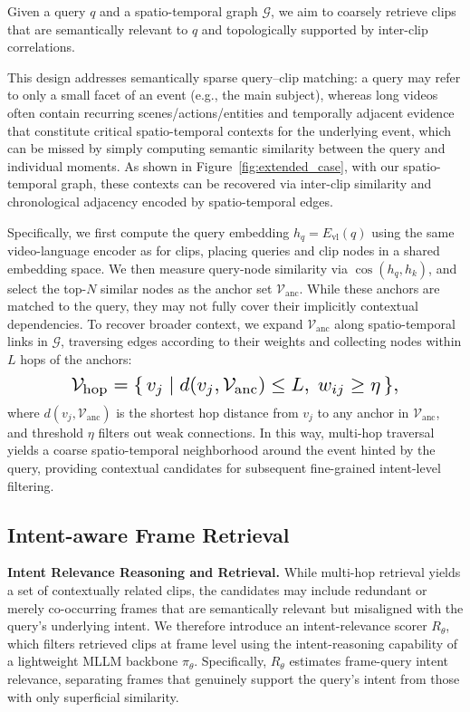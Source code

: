 Given a query $q$ and a spatio-temporal graph $\mathcal{G}$, we aim to coarsely retrieve clips that are semantically relevant to $q$ and topologically supported by inter-clip correlations. {This design addresses semantically sparse query–clip matching: a query may refer to only a small facet of an event (e.g., the main subject), whereas long videos often contain recurring scenes/actions/entities and temporally adjacent evidence that constitute critical spatio-temporal contexts for the underlying event, which can be missed by simply computing semantic similarity between the query and individual moments. As shown in Figure~\ref{fig:extended_case}, with our spatio-temporal graph, these contexts can be recovered via inter-clip similarity and chronological adjacency encoded by spatio-temporal edges. 

Specifically, we first compute the query embedding $h_q = E_{\text{vl}}(q)$ using the same video-language encoder as for clips, placing queries and clip nodes in a shared embedding space. We then measure query-node similarity via $\cos(h_q, h_k)$, and select the top-$N$ similar nodes as the anchor set $\mathcal{V}_{\text{anc}}$. While these anchors are matched to the query, they may not fully cover their implicitly contextual dependencies. To recover broader context, we expand $\mathcal{V}_{\text{anc}}$ along spatio-temporal links in $\mathcal{G}$, traversing edges according to their weights and collecting nodes within $L$ hops of the anchors:
\begin{equation}
\resizebox{0.75\linewidth}{!}{$\displaystyle
\mathcal{V}_\text{hop}
= \{\, v_j \mid d(v_j, \mathcal{V}_{\text{anc}}) \le L,\; w_{ij} \ge \eta \,\},
$}
\end{equation}
where $d(v_j, \mathcal{V}_{\text{anc}})$ is the shortest hop distance from $v_j$ to any anchor in $\mathcal{V}_{\text{anc}}$, and threshold $\eta$ filters out weak connections. {In this way, multi-hop traversal yields a coarse spatio-temporal neighborhood around the event hinted by the query, providing contextual candidates for subsequent fine-grained intent-level filtering.}

\subsection{Intent-aware Frame Retrieval}
\label{sec:method_int}
\noindent\textbf{Intent Relevance Reasoning and Retrieval.} While multi-hop retrieval yields a set of contextually related clips, the candidates may include redundant or merely co-occurring frames that are semantically relevant but misaligned with the query’s underlying intent. We therefore introduce an intent-relevance scorer $R_\theta$, which filters retrieved clips at frame level using the intent-reasoning capability of a lightweight MLLM backbone $\pi_{\theta}$. Specifically, $R_\theta$ estimates frame-query intent relevance, separating frames that genuinely support the query’s intent from those with only superficial similarity.

}
